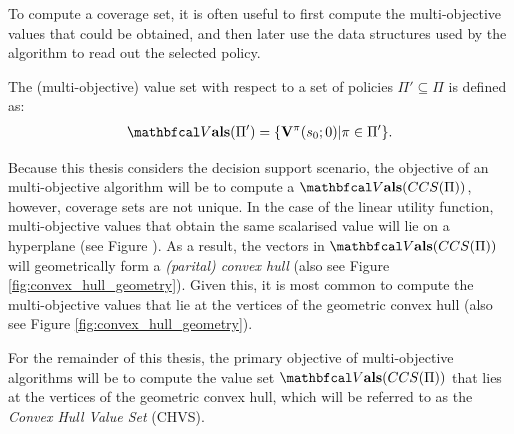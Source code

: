     To compute a coverage set, it is often useful to first compute the multi-objective values that could be obtained, and then later use the data structures used by the algorithm to read out the selected policy. 

    \begin{defn}
        \label{def:mo_value_set}
        The \textnormal{(multi-objective) value set} with respect to a set of policies $\Pi'\subseteq\Pi$ is defined as:
        \begin{align}
            \valset(\Pi') = \{\bff{V}^{\pi}(s_0;0) | \pi \in \Pi'\}.
        \end{align}
    \end{defn}

    Because this thesis considers the decision support scenario, the objective of an multi-objective algorithm will be to compute a $\valset(CCS(\Pi))$, however, coverage sets are not unique. In the case of the linear utility function, multi-objective values that obtain the same scalarised value will lie on a hyperplane (see Figure ). As a result, the vectors in $\valset(CCS(\Pi))$ will geometrically form a \textit{(parital) convex hull} (also see Figure \ref{fig:convex_hull_geometry}). Given this, it is most common to compute the multi-objective values that lie at the vertices of the geometric convex hull (also see Figure \ref{fig:convex_hull_geometry}). 

    For the remainder of this thesis, the primary objective of multi-objective algorithms will be to compute the value set $\valset(CCS(\Pi))$ that lies at the vertices of the geometric convex hull, which will be referred to as the \textit{Convex Hull Value Set} (CHVS). 

